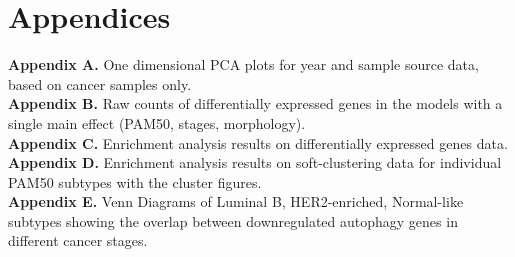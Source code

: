 \documentclass[10pt, openright,oneside]{book}
\newcommand\blankpage{%
    \null
    \thispagestyle{empty}%
    \addtocounter{page}{-1}%
    \newpage}
\begin{document}
\cleardoublepage
{}
\printbibliography



\cleardoublepage
{}


\afterpage{\blankpage}
\chapter*{Appendices}


   \textbf{Appendix A. }One dimensional PCA plots for year and sample source data, based on cancer samples only.\\
   
   
   \textbf{Appendix B. }Raw counts of differentially expressed genes in the models with a single main effect (PAM50, stages, morphology).\\
   
   
   \textbf{Appendix C. }Enrichment analysis results on differentially expressed genes data.\\
   
   
   \textbf{Appendix D. }Enrichment analysis results on soft-clustering data for individual PAM50 subtypes with the cluster figures.\\
   
   
   \textbf{Appendix E. } Venn Diagrams of Luminal B, HER2-enriched, Normal-like subtypes showing the overlap between downregulated autophagy genes in different cancer stages. \\

\afterpage{\blankpage}





\backmatter
\end{document}
